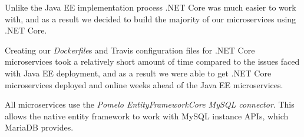 \par
Unlike the Java EE implementation process .NET Core was much easier to work with, and as a result we decided to build the majority of our microservices using .NET Core. 

\par
Creating our \textit{Dockerfile}s and Travis configuration files for .NET Core microservices took a relatively short amount of time compared to the issues faced with Java EE deployment, and as a result we were able to get .NET Core microservices deployed and online weeks ahead of the Java EE microservices.

\par
All microservices use the \textit{Pomelo EntityFrameworkCore MySQL connector}\cite{Pomelo}. This allows the native entity framework to work with MySQL instance APIs, which MariaDB provides.